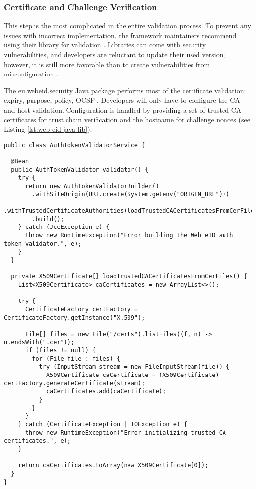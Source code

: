 \subsubsection{Certificate and Challenge Verification}

This step is the most complicated in the entire validation process. To prevent any issues with incorrect implementation, the framework maintainers recommend using their library for validation \cite{ria-webeid-source-web-eid-authtoken-validation-java-readme}. Libraries can come with security vulnerabilities, and developers are reluctant to update their used version; however, it is still more favorable than to create vulnerabilities from misconfiguration \cite{9240619}.

The eu.webeid.security Java package performs most of the certificate validation: expiry, purpose, policy, OCSP \cite{ria-webeid-source-web-eid-authtoken-validation-java-readme}. Developers will only have to configure the CA and host validation. Configuration is handled by providing a set of trusted CA certificates for trust chain verification and the hostname for challenge nonces (see Listing \ref{lst:web-eid-java-lib}).

\begin{lstlisting}[caption={Web eID Login Endpoint}, label={lst:web-eid-java-lib}]
public class AuthTokenValidatorService {

  @Bean
  public AuthTokenValidator validator() {
    try {
      return new AuthTokenValidatorBuilder()
        .withSiteOrigin(URI.create(System.getenv("ORIGIN_URL")))
        .withTrustedCertificateAuthorities(loadTrustedCACertificatesFromCerFiles())
        .build();
    } catch (JceException e) {
      throw new RuntimeException("Error building the Web eID auth token validator.", e);
    }
  }

  private X509Certificate[] loadTrustedCACertificatesFromCerFiles() {
    List<X509Certificate> caCertificates = new ArrayList<>();

    try {
      CertificateFactory certFactory = CertificateFactory.getInstance("X.509");

      File[] files = new File("/certs").listFiles((f, n) -> n.endsWith(".cer"));
      if (files != null) {
        for (File file : files) {
          try (InputStream stream = new FileInputStream(file)) {
            X509Certificate caCertificate = (X509Certificate) certFactory.generateCertificate(stream);
            caCertificates.add(caCertificate);
          }
        }
      }
    } catch (CertificateException | IOException e) {
      throw new RuntimeException("Error initializing trusted CA certificates.", e);
    }

    return caCertificates.toArray(new X509Certificate[0]);
  }
}
\end{lstlisting}

